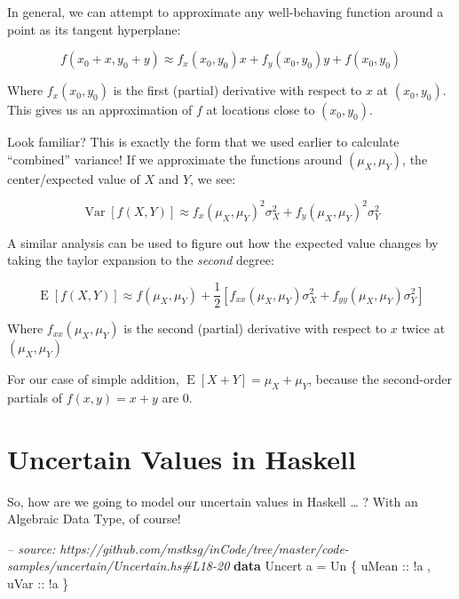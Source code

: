 \documentclass[]{article}
\newenvironment{Shaded}{}{}
\newcommand{\KeywordTok}[1]{\textcolor[rgb]{0.00,0.44,0.13}{\textbf{{#1}}}}
\newcommand{\DataTypeTok}[1]{\textcolor[rgb]{0.56,0.13,0.00}{{#1}}}
\newcommand{\CommentTok}[1]{\textcolor[rgb]{0.38,0.63,0.69}{\textit{{#1}}}}
\newcommand{\OtherTok}[1]{\textcolor[rgb]{0.00,0.44,0.13}{{#1}}}
\newcommand{\FunctionTok}[1]{\textcolor[rgb]{0.02,0.16,0.49}{{#1}}}
\newcommand{\NormalTok}[1]{{#1}}
\begin{document}
In general, we can attempt to approximate any well-behaving function
around a point as its tangent hyperplane:

\[
f(x_0 + x, y_0 + y) \approx f_x(x_0, y_0) x + f_y(x_0, y_0) y + f(x_0, y_0)
\]

Where \(f_x(x_0,y_0)\) is the first (partial) derivative with respect to
\(x\) at \((x_0, y_0)\). This gives us an approximation of \(f\) at
locations close to \((x_0, y_0)\).

Look familiar? This is exactly the form that we used earlier to
calculate ``combined'' variance! If we approximate the functions around
\((\mu_X, \mu_Y)\), the center/expected value of \(X\) and \(Y\), we
see:

\[
\operatorname{Var}[f(X,Y)] \approx f_x(\mu_X, \mu_Y)^2 \sigma_X^2 + f_y(\mu_X,\mu_Y)^2 \sigma_Y^2
\]

A similar analysis can be used to figure out how the expected value
changes by taking the taylor expansion to the \emph{second} degree:

\[
\operatorname{E}[f(X,Y)] \approx
f(\mu_X, \mu_Y) + \frac{1}{2}
\left[ f_{xx}(\mu_X, \mu_Y) \sigma_X^2 + f_{yy}(\mu_X, \mu_Y) \sigma_Y^2 \right]
\]

Where \(f_{xx}(\mu_X, \mu_Y)\) is the second (partial) derivative with
respect to \(x\) twice at \((\mu_X, \mu_Y)\)

For our case of simple addition,
\(\operatorname{E}[X + Y] = \mu_X + \mu_Y\), because the second-order
partials of \(f(x,y) = x + y\) are 0.

\section{Uncertain Values in Haskell}\label{uncertain-values-in-haskell}

So, how are we going to model our uncertain values in Haskell \ldots{} ?
With an Algebraic Data Type, of course!

\begin{Shaded}
\begin{Highlighting}[]
\CommentTok{-- source: https://github.com/mstksg/inCode/tree/master/code-samples/uncertain/Uncertain.hs#L18-20}
\KeywordTok{data} \DataTypeTok{Uncert} \NormalTok{a }\FunctionTok{=} \DataTypeTok{Un} \NormalTok{\{}\OtherTok{ uMean ::} \FunctionTok{!}\NormalTok{a}
                   \NormalTok{,}\OtherTok{ uVar  ::} \FunctionTok{!}\NormalTok{a}
                   \NormalTok{\}}
\end{Highlighting}
\end{Shaded}
\end{document}
